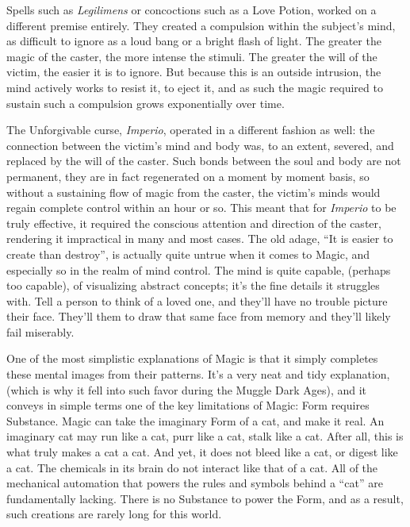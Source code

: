 Spells such as \emph{Legilimens} or concoctions such as a Love Potion, worked on a different premise entirely. They created a compulsion within the subject’s mind, as difficult to ignore as a loud bang or a bright flash of light. The greater the magic of the caster, the more intense the stimuli. The greater the will of the victim, the easier it is to ignore. But because this is an outside intrusion, the mind actively works to resist it, to eject it, and as such the magic required to sustain such a compulsion grows exponentially over time.

The Unforgivable curse, \emph{Imperio}, operated in a different fashion as well: the connection between the victim’s mind and body was, to an extent, severed, and replaced by the will of the caster. Such bonds between the soul and body are not permanent, they are in fact regenerated on a moment by moment basis, so without a sustaining flow of magic from the caster, the victim’s minds would regain complete control within an hour or so. This meant that for \emph{Imperio} to be truly effective, it required the conscious attention and direction of the caster, rendering it impractical in many and most cases.
\SmallVSpace
The old adage, “It is easier to create than destroy”, is actually quite untrue when it comes to Magic, and especially so in the realm of mind control. The mind is quite capable, (perhaps too capable), of visualizing abstract concepts; it’s the fine details it struggles with. Tell a person to think of a loved one, and they’ll have no trouble picture their face. They’ll them to draw that same face from memory and they’ll likely fail miserably.

One of the most simplistic explanations of Magic is that it simply completes these mental images from their patterns. It’s a very neat and tidy explanation, (which is why it fell into such favor during the Muggle Dark Ages), and it conveys in simple terms one of the key limitations of Magic: Form requires Substance. Magic can take the imaginary Form of a cat, and make it real. An imaginary cat may run like a cat, purr like a cat, stalk like a cat. After all, this is what truly makes a cat a cat. And yet, it does not bleed like a cat, or digest like a cat. The chemicals in its brain do not interact like that of a cat. All of the mechanical automation that powers the rules and symbols behind a “cat” are fundamentally lacking. There is no Substance to power the Form, and as a result, such creations are rarely long for this world.

